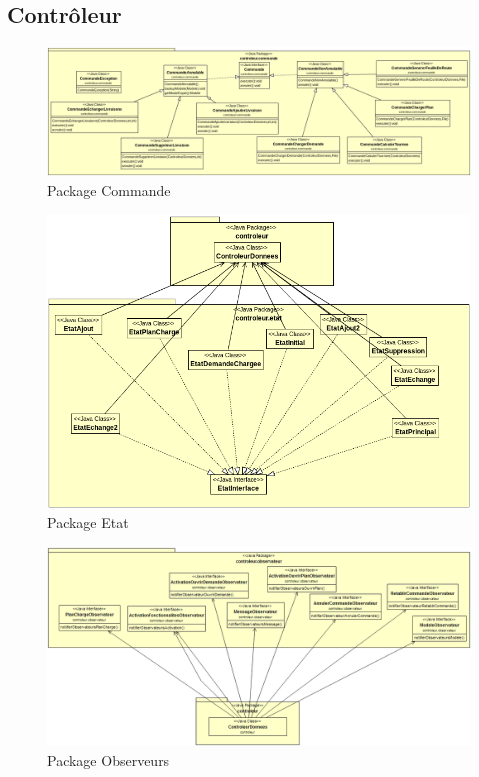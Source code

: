 \documentclass[10pt,a4paper]{book}
\begin{document}
\subsection{Contrôleur}
\begin{figure}[h!]
    \centering
    \includegraphics[scale=0.38]{DcCommande.png}
    \caption{Package Commande}
\end{figure}
\newpage
\begin{figure}[h!]
    \centering
    \includegraphics[scale=0.65]{DcEtat.png}
    \caption{Package Etat}
\end{figure}
\begin{figure}[h!]
    \centering
    \includegraphics[scale=0.4]{DcObservateur.png}
    \caption{Package Observeurs}
\end{figure}
\end{document}
